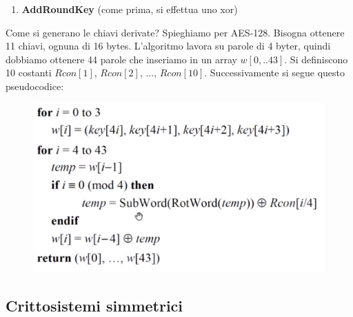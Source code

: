 \begin{itemize}
\begin{enumerate}
			\item \textbf{AddRoundKey} (come prima, si effettua uno xor)
		\end{enumerate} 
		
	Come si generano le chiavi derivate? Spieghiamo per AES-128.
	Bisogna ottenere 11 chiavi, ognuna di 16 bytes. L'algoritmo lavora su parole di 4 byter, quindi dobbiamo ottenere 44 parole che inseriamo in un array $w[0,..43]$. Si definiscono 10 costanti $Rcon[1]$, $Rcon[2]$, ..., $Rcon[10]$. Successivamente si segue questo pseudocodice:
	
		\begin{figure}[h]
		\centering
		\includegraphics[width=0.9\linewidth]{immagini/img36}
	\end{figure}

\subsection*{Crittosistemi simmetrici}


\end{itemize}
